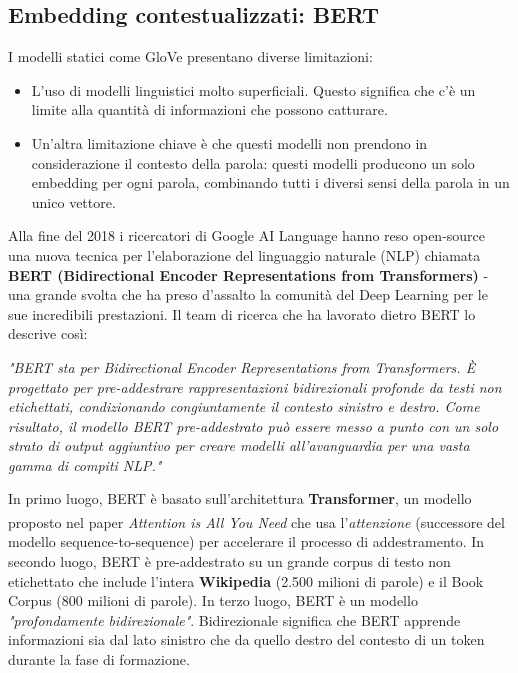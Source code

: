 \subsection{Embedding contestualizzati: BERT}
I modelli statici come GloVe presentano diverse limitazioni:
\begin{itemize}
    \item L'uso di modelli linguistici molto superficiali. Questo significa che c'è un limite alla quantità di informazioni che possono catturare.
    \item Un'altra limitazione chiave è che questi modelli non prendono in considerazione il contesto della parola: questi modelli producono un solo embedding per ogni parola, combinando tutti i diversi sensi della parola in un unico vettore.
\end{itemize}
Alla fine del 2018 i ricercatori di Google AI Language hanno reso open-source una nuova tecnica per l'elaborazione del linguaggio naturale (NLP) chiamata \textbf{BERT (Bidirectional Encoder Representations from Transformers)} - una grande svolta che ha preso d'assalto la comunità del Deep Learning per le sue incredibili prestazioni. Il team di ricerca che ha lavorato dietro BERT lo descrive così:
\begin{center}
    \textit{"BERT sta per Bidirectional Encoder Representations from Transformers.  È progettato per pre-addestrare rappresentazioni bidirezionali profonde da testi non etichettati, condizionando congiuntamente il contesto sinistro e destro. Come risultato, il modello BERT pre-addestrato può essere messo a punto con un solo strato di output aggiuntivo per creare modelli all'avanguardia per una vasta gamma di compiti NLP."}
\end{center}
In primo luogo, BERT è basato sull'architettura \textbf{Transformer}, un modello proposto nel paper \textit{Attention is All You Need}\textsuperscript{\cite{vaswani2017attention}} che usa l'\textit{attenzione} (successore del modello sequence-to-sequence) per accelerare il processo di addestramento. In secondo luogo, BERT è pre-addestrato su un grande corpus di testo non etichettato che include l'intera \textbf{Wikipedia} (2.500 milioni di parole) e il Book Corpus (800 milioni di parole). In terzo luogo, BERT è un modello \textit{"profondamente bidirezionale"}. Bidirezionale significa che BERT apprende informazioni sia dal lato sinistro che da quello destro del contesto di un token durante la fase di formazione.

